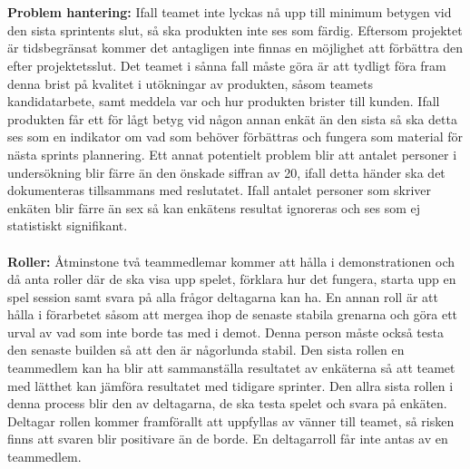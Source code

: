 \documentclass[10pt]{article}
\begin{document}
	\\\\
	\textbf{Problem hantering:} Ifall teamet inte lyckas nå upp till minimum betygen vid den sista sprintents slut, så ska produkten inte ses som färdig. Eftersom projektet är tidsbegränsat kommer det antagligen inte finnas en möjlighet att förbättra den efter projektetsslut. Det teamet i sånna fall måste göra är att tydligt föra fram denna brist på kvalitet i utökningar av produkten, såsom teamets kandidatarbete, samt meddela var och hur produkten brister till kunden.
	Ifall produkten får ett för lågt betyg vid någon annan enkät än den sista så ska detta ses som en indikator om vad som behöver förbättras och fungera som material för nästa sprints plannering.
	Ett annat potentielt problem blir att antalet personer i undersökning blir färre än den önskade siffran av 20, ifall detta händer ska det dokumenteras tillsammans med reslutatet. Ifall antalet personer som skriver enkäten blir färre än sex så kan enkätens resultat ignoreras och ses som ej statistiskt signifikant.
	\\\\
	\textbf{Roller:} Åtminstone två teammedlemar kommer att hålla i demonstrationen och då anta roller där de ska visa upp spelet, förklara hur det fungera, starta upp en spel session samt svara på alla frågor deltagarna kan ha. En annan roll är att hålla i förarbetet såsom att mergea ihop de senaste stabila grenarna och göra ett urval av vad som inte borde tas med i demot. Denna person måste också testa den senaste builden så att den är någorlunda stabil. Den sista rollen en teammedlem kan ha blir att sammanställa resultatet av enkäterna så att teamet med lätthet kan jämföra resultatet med tidigare sprinter.	Den allra sista rollen i denna process blir den av deltagarna, de ska testa spelet och svara på enkäten. Deltagar rollen kommer framförallt att uppfyllas av vänner till teamet, så risken finns att svaren blir positivare än de borde. En deltagarroll får inte antas av en teammedlem.
	
	
\end{document}
